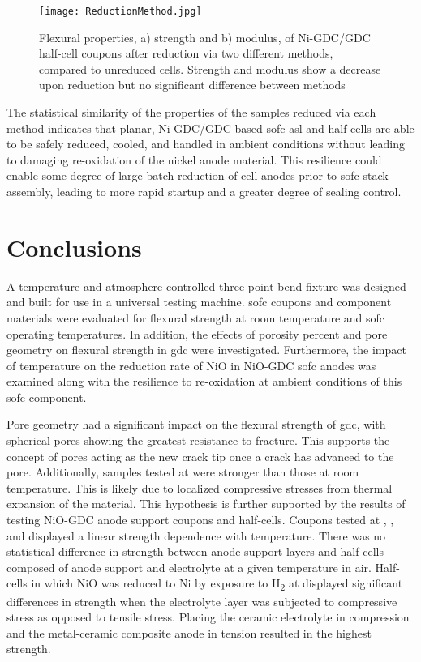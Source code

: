 \begin{figure}
    \texttt{[image: ReductionMethod.jpg]}
    \caption{Flexural properties, a) strength and b) modulus, of Ni-GDC/GDC half-cell coupons after reduction via two different methods, compared to unreduced cells. Strength and modulus show a decrease upon reduction but no significant difference between methods}
    \label{fig:reductionmethod}
\end{figure}

The statistical similarity of the properties of the samples reduced via each method indicates that planar, Ni-GDC/GDC based \gls{sofc} \gls{asl} and half-cells are able to be safely reduced, cooled, and handled in ambient conditions without leading to damaging re-oxidation of the nickel anode material.
This resilience could enable some degree of large-batch reduction of cell anodes prior to \gls{sofc} stack assembly, leading to more rapid startup and a greater degree of sealing control.

\section{Conclusions}

A temperature and atmosphere controlled three-point bend fixture was designed and built for use in a universal testing machine.
\gls{sofc} coupons and component materials were evaluated for flexural strength at room temperature and \gls{sofc} operating temperatures.
In addition, the effects of porosity percent and pore geometry on flexural strength in \gls{gdc} were investigated.
Furthermore, the impact of temperature on the reduction rate of NiO in NiO-GDC \gls{sofc} anodes was examined along with the resilience to re-oxidation at ambient conditions of this \gls{sofc} component.

Pore geometry had a significant impact on the flexural strength of
\Gls{gdc}, with spherical pores showing the greatest resistance to fracture.
This supports the concept of pores acting as the new crack tip once a crack has advanced to the pore.
Additionally, samples tested at  were stronger than those at room temperature.
This is likely due to localized compressive stresses from thermal expansion of the material.
This hypothesis is further supported by the results of testing NiO-GDC
anode support coupons and half-cells.
Coupons tested at , , and  displayed a linear strength dependence with temperature.
There was no statistical difference in strength between anode support layers and half-cells composed of anode support and electrolyte at a given temperature in air.
Half-cells in which NiO was reduced to Ni by exposure to H\textsubscript{2} at  displayed significant differences in strength when the electrolyte layer was subjected to compressive stress as opposed to tensile stress.
Placing the ceramic electrolyte in compression and the metal-ceramic composite anode in tension resulted in the highest strength.

